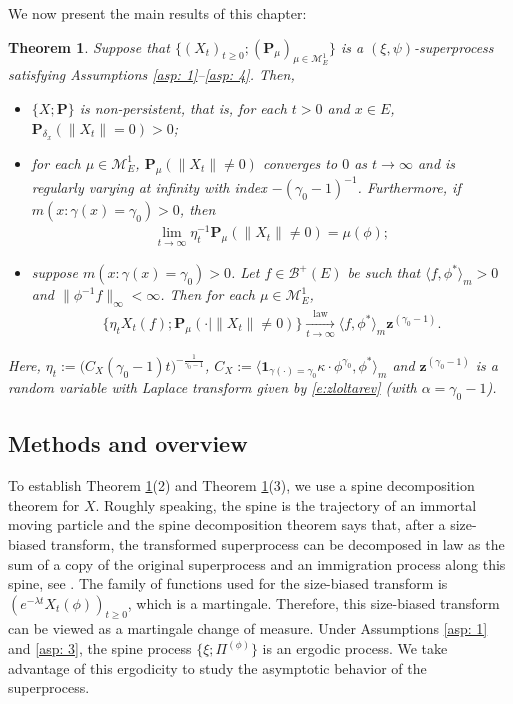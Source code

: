 \documentclass[UTF8]{pkuthss}
\theoremstyle{plain}
\newtheorem{thm}{Theorem}[section]
\theoremstyle{definition}
\numberwithin{equation}{section}
\begin{document}
	We now present the main results of this chapter:

\begin{thm} \label{thm: main theorem}
	Suppose that $\{(X_t)_{t\geq 0}; (\mathbf P_\mu)_{\mu \in \mathcal M_E^1}\}$ is a $(\xi, \psi)$-superprocess satisfying Assumptions \ref{asp: 1}--\ref{asp: 4}.
	Then,
\begin{itemize}
\item[(1)]
	$\{X; \mathbf P\}$ is non-persistent, that is, for each $t > 0$ and $x\in E$,
	$\mathbf P_{\delta_x}( \| X_t\| = 0) > 0$;
\item[(2)]
	for each $\mu \in \mathcal M^1_E$, $\mathbf P_{\mu}(\|X_t\| \neq 0)$ converges to
	$0$ as $t \to \infty$ and is regularly varying at infinity with index $-(\gamma_0-1)^{-1}$.
	Furthermore, if $m(x: \gamma (x)= \gamma_0)>0$, then
\begin{align}
	\lim_{t\to\infty} \eta_t^{-1}\mathbf P_{\mu}(\|X_t\| \neq 0)
	=\mu(\phi);
\end{align}
\item[(3)]
	suppose $m( x:\gamma(x)=\gamma_0 )>0$.
	Let $f \in \mathscr B^+(E)$ be such that $\langle f, \phi^* \rangle_m > 0$ and $\| \phi^{-1}f \|_\infty < \infty$. Then for each $\mu \in \mathcal M_E^1$,
\begin{align}
	\{\eta_t X_t(f) ; \mathbf P_{\mu}(\cdot |\|X_t\| \neq 0) \}
	\xrightarrow[t\to \infty]{\operatorname{law}} \langle f, \phi^*\rangle_m \mathbf z^{(\gamma_0 - 1)}.
\end{align}
\end{itemize}
	Here, $\eta_t := \big( C_X(\gamma_0 - 1) t \big)^{- \frac {1} {\gamma_0 - 1} }$, $C_X := \langle \mathbf 1_{\gamma(\cdot) = \gamma_0} \kappa\cdot \phi^{\gamma_0}, \phi^* \rangle_m$ 
	and $\mathbf z^{(\gamma_0 - 1)}$ is a random variable with Laplace transform given by \eqref{e:zloltarev} 
	(with $\alpha=\gamma_0 -1$).

\end{thm}

\subsection{Methods and overview}
	
	To establish Theorem \ref{thm: main theorem}(2) and Theorem \ref{thm: main theorem}(3), we use a spine decomposition theorem for 	$X$.
	Roughly speaking, the spine is the trajectory of an immortal moving particle and the spine decomposition theorem says that, after a size-biased transform, the transformed superprocess can be decomposed in law as the sum of a copy of the original superprocess and an immigration process along this spine, see \cite{EckhoffKyprianouWinkel2015Spines, EnglanderKyprianou2004Local, LiuRenSong2009Log}.
	The family of functions used for the size-biased transform is $(e^{-\lambda t} X_t(\phi))_{t\geq 0}$, which is a martingale.
	Therefore, this size-biased transform can be viewed as a martingale change of measure.
	Under Assumptions \ref{asp: 1} and \ref{asp: 3}, the spine process $\{\xi; \Pi^{(\phi)}\}$ is an ergodic process.
	We take advantage of this ergodicity to study the asymptotic behavior of the superprocess.
	
\end{document}
